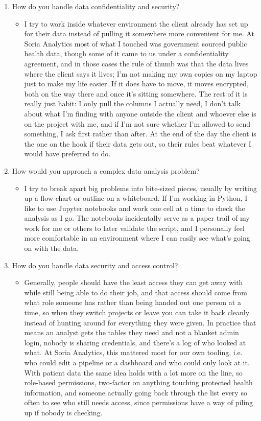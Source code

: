 \documentclass[11pt]{article}
\newcommand{\answer}[1]{%
  \par\vspace{0.35em}%
  \begin{itemize}[label={},leftmargin=1.5em,topsep=0pt,partopsep=0pt,parsep=0pt,itemsep=0pt]
    \item #1
  \end{itemize}%
  \vspace{0.35em}%
}
\begin{document}
\begin{enumerate}[leftmargin=*]
    \item How do you handle data confidentiality and security?
    \answer{I try to work inside whatever environment the client already has set up for their data instead of pulling it
    somewhere more convenient for me. At Soria Analytics most of what I touched was government sourced public health data, though some
    of it came to us under a confidentiality agreement, and in those cases the rule of thumb was that the data lives where
    the client says it lives; I'm not making my own copies on my laptop just to make my life easier. If it does have to
    move, it moves encrypted, both on the way there and once it's sitting somewhere. The rest of it is really just habit: I
    only pull the columns I actually need, I don't talk about what I'm finding with anyone outside the client and whoever
    else is on the project with me, and if I'm not sure whether I'm allowed to send something, I ask first rather than
    after. At the end of the day the client is the one on the hook if their data gets out, so their rules beat whatever I
    would have preferred to do.}

    \item How would you approach a complex data analysis problem?
    \answer{I try to break apart big problems into bite-sized pieces, usually by writing up a flow chart or outline on a 
    whiteboard. If I'm working in Python, I like to use Jupyter notebooks and work one cell at a time to check the analysis as I go.
    The notebooks incidentally serve as a paper trail of my work for me or others to later validate the script, and I personally
    feel more comfortable in an environment where I can easily see what's going on with the data.}

    \item How do you handle data security and access control?
    \answer{Generally, people should have the least access they can get away with while still being able to do their job, 
    and that access should come from what role someone has rather than being handed out one person at a time, so when they switch 
    projects or leave you can take it back cleanly instead of hunting around for everything they were given. In practice that 
    means an analyst gets the tables they need and not a blanket admin login, nobody is sharing credentials, and there's a log of who 
    looked at what. At Soria Analytics, this mattered most for our own tooling, i.e. who could edit a pipeline or a dashboard and who 
    could only look at it. With patient data the same idea holds with a lot more on the line, so role-based permissions, two-factor on
    anything touching protected health information, and someone actually going back through the list every so often to see who still 
    needs access, since permissions have a way of piling up if nobody is checking.}


\end{enumerate}
\end{document}
